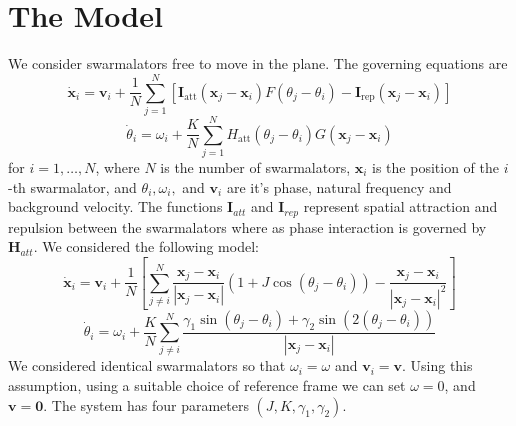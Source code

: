 \documentclass[twocolumn,10pt]{asme2ej}
\begin{document}
\section{The Model}
{
    We consider swarmalators free to move in the plane. The governing equations are     \noindent
    \begin{equation}
        \dot{\mathbf{x}}_{i}=\mathbf{v}_{i}+\frac{1}{N} \sum_{j=1}^{N}\left[\mathbf{I}_{\mathrm{att}}\left(\mathbf{x}_{j}-\mathbf{x}_{i}\right) F\left(\theta_{j}   -\theta_{i}\right)-\mathbf{I}_{\mathrm{rep}}\left(\mathbf{x}_{j}-\mathbf{x}_{i}    \right)\right]
    \end{equation}
    \begin{equation}
        \dot{\theta}_{i}=\omega_{i}+\frac{K}{N} \sum_{j=1}^{N} H_{\mathrm{att}}\left(\theta_{j}-\theta_{i}\right) G\left(\mathbf{x}_{j}-\mathbf{x}_{i}\right)
    \end{equation}
    for \(i = 1,\ldots,N\), where \(N\) is the number of swarmalators, $\mathbf{x}_{i} $ is the position of the \(i\)-th swarmalator, and $\theta_i,\omega_i,$ and $\mathbf{v}_i$ are it's phase, natural frequency and background velocity. The functions $\mathbf{I}_  {att}$ and $\mathbf{I}_{rep}$ represent spatial attraction and repulsion between the swarmalators where as phase interaction is governed by $\mathbf{H}_{att}$. We considered the following model:
    \begin{equation} \label{eq:space}
        \dot{\mathbf{x}}_{i}=\mathbf{v}_{i}+\frac{1}{N}\left[\sum_{j \neq i}^{N} \frac  {\mathbf{x}_{j}-\mathbf{x}_{i}}{\left|\mathbf{x}_{j}-\mathbf{x}_{i}\right|}\left  (1+J \cos \left(\theta_{j}-\theta_{i}\right)\right)-\frac{\mathbf{x}_{j}-\mathbf{x}_{i}}{\left|\mathbf{x}_{j}-\mathbf{x}_{i}\right|^{2}}\right]
    \end{equation}
    \begin{equation} \label{eq:phase}
        \dot{\theta}_{i}=\omega_{i}+\frac{K}{N} \sum_{j \neq i}^{N} \frac{\gamma_1 \sin\left(\theta_{j}-\theta_{i}\right) + \gamma_2 \sin \left(2 \left(\theta_j -\theta_i\right)\right) }{\left|\mathbf{x}_{j}-\mathbf{x}_{i}\right|} 
    \end{equation}
    We considered identical swarmalators so that $\omega_i = \omega$ and $\mathbf{v}_i = \mathbf{v}$. Using this assumption, using a suitable choice of reference frame we  can set $\omega = 0$, and $\mathbf{v} = \mathbf{0}$. The system has four parameters $\left(J,K,\gamma_1,\gamma_2\right )$.

}
\end{document}
